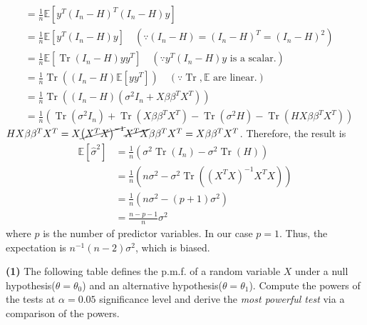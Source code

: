 \documentclass[answers]{exam}
\DeclareMathOperator{\Tr}{Tr}
\begin{document}
\begin{questions}
\begin{solution}
\begin{align*}
         &= \frac{1}{n}\mathbb{E}\left[y^{T}\left(I_{n}-H\right)^{T}\left(I_{n}-H\right)y\right]\\
         &= \frac{1}{n}\mathbb{E}\left[y^{T}\left(I_{n}-H\right)y\right] \quad \left(\because \left(I_{n}-H\right)=\left(I_{n}-H\right)^{T}=\left(I_{n}-H\right)^{2}\right)\\
         &= \frac{1}{n}\mathbb{E}\left[\Tr \left(I_{n}-H\right)yy^{T}\right] \quad \left(\because y^{T}\left(I_{n}-H\right)y \text{ is a scalar}.\right)\\
         &= \frac{1}{n}\Tr\left(\left(I_{n}-H\right)\mathbb{E}\left[yy^{T}\right]\right) \quad \left(\because \Tr, \mathbb{E} \text{ are linear}.\right)\\
         &= \frac{1}{n}\Tr \left(\left(I_{n}-H\right)\left(\sigma^{2}I_{n}+X\beta\beta^{T}X^{T}\right) \right)\\
         &= \frac{1}{n}\left(\Tr\left(\sigma^{2}I_{n}\right)+\Tr\left(X\beta\beta^{T}X^{T}\right) -\Tr\left(\sigma^{2}H\right)-\Tr\left(HX\beta\beta^{T}X^{T}\right) \right)
      \end{align*}
      $HX\beta\beta^{T}X^{T} = X\cancel{\left(X^{T}X\right)^{-1}}\cancel{X^{T}X}\beta\beta^{T}X^{T}=X\beta\beta^{T}X^{T}$. Therefore, the result is
      \begin{align*}
         \mathbb{E}\left[\widehat{\sigma}^{2}\right] &= \frac{1}{n}\left(\sigma^{2}\Tr\left(I_{n}\right) - \sigma^{2}\Tr\left(H\right) \right)\\
         &= \frac{1}{n}\left(n\sigma^{2} - \sigma^{2}\Tr\left(\left(X^{T}X\right)^{-1}X^{T}X\right)\right)\\
         &= \frac{1}{n}\left(n\sigma^{2}- \left(p+1\right)\sigma^{2}\right)\\
         &= \frac{n-p-1}{n}\sigma^{2}
      \end{align*}
      where $p$ is the number of predictor variables. In our case $p=1$. Thus, the expectation is $n^{-1}\left(n-2\right)\sigma^{2}$, which is biased.
   \end{solution}
      \question
      \textbf{(1)} The following table defines the p.m.f. of a random variable $X$ under a null hypothesis($\theta=\theta_{0}$) and an alternative hypothesis($\theta=\theta_{1}$). Compute the powers of the tests at $\alpha=0.05$ significance level and derive the \emph{most powerful test} via a comparison of the powers.
      \begin{table}[!htbp]
      \centering
        \begin{tabular}{*7c}
          \toprule

\end{tabular}
\end{table}
\end{questions}
\end{document}
